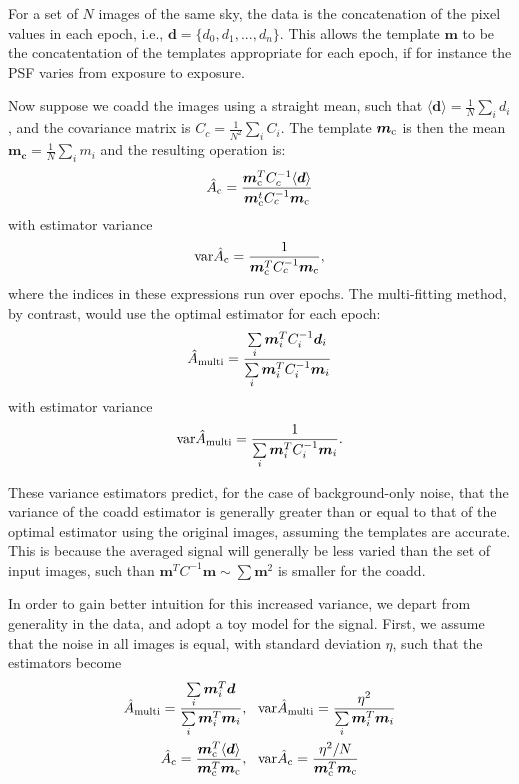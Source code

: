 \documentclass[a4paper,fleqn,usenatbib,referee]{mnras}
\begin{document}
For a set of $N$ images of the same sky, the data is the concatenation of the
pixel values in each epoch, i.e., $\boldsymbol{d} = \{d_0, d_1, ..., d_n \}$.
This allows the template $\boldsymbol{m}$ to be the concatentation of the
templates appropriate for each epoch, if for instance the PSF varies from
exposure to exposure.

Now suppose we coadd the images using a straight mean, such that $\langle
\boldsymbol{d} \rangle = \frac{1}{N}\sum\limits_i d_i$, and the covariance
matrix is $C_c = \frac{1}{N^2}\sum\limits_i C_i$.  The template
$\boldsymbol{m}_{\rm c}$ is then the mean $\boldsymbol{m_c} = \frac{1}{N}\sum\limits_i m_i$
and the resulting operation is:
\begin{align}
    \hat{A}_{\rm c} = \frac{\boldsymbol{m}_{\rm c}^T C_c^{-1} \langle \boldsymbol{d} \rangle}{\boldsymbol{m}_{\rm c}^t C_c^{-1}\boldsymbol{m}_{\rm c}} 
\end{align}
with estimator variance
\begin{align} \label{eq:coaddvarest}
{\rm var}\hat{A}_{\rm c} = \frac{1}{\boldsymbol{m}_{\rm c}^T C_c^{-1}\boldsymbol{m}_{\rm c}},
\end{align}
where the indices in these expressions run over epochs. The multi-fitting
method, by contrast, would use the optimal estimator for each epoch:
\begin{align}
\hat{A}_{\rm multi} = \frac{\sum\limits_i \boldsymbol{m}_i^T C_i^{-1}\boldsymbol{d}_i}{\sum\limits_i \boldsymbol{m}_i^T C_i^{-1}\boldsymbol{m}_i}
\end{align}
with estimator variance
\begin{align}
{\rm var}\hat{A}_{\rm multi} = \frac{1}{\sum\limits_i \boldsymbol{m}_i^T C_i^{-1}\boldsymbol{m}_i}.
\end{align}

These variance estimators predict, for the case of background-only noise, that the
variance of the coadd estimator is generally greater than or equal to that of
the optimal estimator using the original images, assuming the templates are
accurate.  This is because the averaged signal will generally be less varied
than the set of input images, such than $\boldsymbol{m}^T C^{-1} \boldsymbol{m}
\sim \sum \boldsymbol{m}^2$ is smaller for the coadd.

In order to gain better intuition for this increased variance, we depart from
generality in the data, and adopt a toy model for the signal.  First, we assume
that the noise in all images is equal, with standard deviation $\eta$, such
that the estimators become
\begin{align}
    \hat{A}_{\rm multi} = \frac{\sum\limits_i \boldsymbol{m}_i^T \boldsymbol{d}}{\sum\limits_i \boldsymbol{m}_i^T \boldsymbol{m}_i}&, ~~
    {\rm var}\hat{A}_{\rm multi} = \frac{\eta^2}{\sum\limits_i \boldsymbol{m}_i^T \boldsymbol{m}_i}\\
    \hat{A}_{\rm c} = \frac{\boldsymbol{m}_{\rm c}^T \langle \boldsymbol{d} \rangle}{\boldsymbol{m}_{\rm c}^T \boldsymbol{m}_{\rm c}}&, ~~
    {\rm var}\hat{A}_{\rm c} = \frac{\eta^2/N}{\boldsymbol{m}_{\rm c}^T \boldsymbol{m}_{\rm c}}
\end{align}
\end{document}
